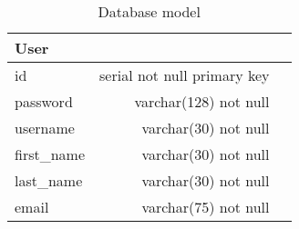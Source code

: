 \FloatBarrier
\begin{table}[!htp]\centering
    \caption{Database model}\label{tab:dbModel}
    \scriptsize
    \begin{tabular}{lrr}\toprule
        User        &                             \\\midrule
        id          & serial not null primary key \\
        password    & varchar(128) not null       \\
        username    & varchar(30) not null        \\
        first\_name & varchar(30) not null        \\
        last\_name  & varchar(30) not null        \\
        email       & varchar(75) not null        \\
        \bottomrule
    \end{tabular}
\end{table}
\FloatBarrier
